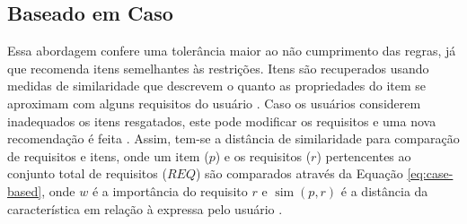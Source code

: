     
    
    
\subsection{Baseado em Caso}
    Essa abordagem confere uma tolerância maior ao não cumprimento das regras, já que recomenda itens semelhantes às restrições. Itens são recuperados usando medidas de similaridade que descrevem o quanto as propriedades do item se aproximam com alguns requisitos do usuário \cite{Aggarwal2016}. Caso os usuários considerem inadequados os itens resgatados, este pode modificar os requisitos e uma nova recomendação é feita \cite{Lorenzi2005}.
    Assim, tem-se a distância de similaridade para comparação de requisitos e itens, onde um item ($p$) e os requisitos ($r$) pertencentes ao conjunto total de requisitos ($REQ$) são comparados através da Equação \ref{eq:case-based}, onde $w$ é a importância do requisito $r$ e $\operatorname{sim}(p, r)$ é a distância da característica em relação à expressa pelo usuário \cite{Jannach2010}. 
    
